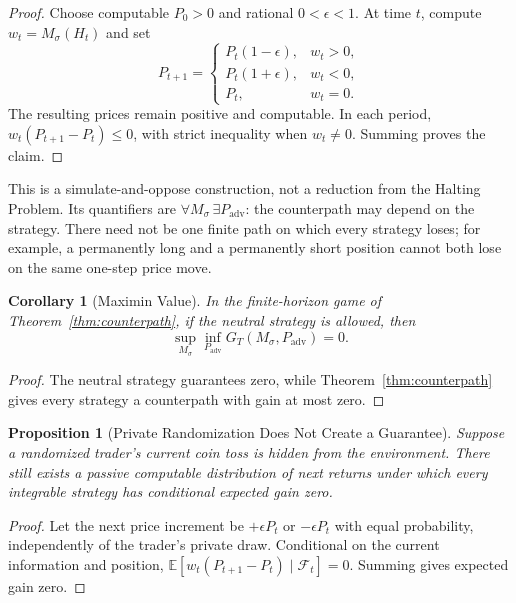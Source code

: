 \documentclass[aps,pra,reprint,superscriptaddress,amsmath,amssymb]{revtex4-2}
\theoremstyle{plain}
\newtheorem{corollary}[theorem]{Corollary}
\newtheorem{proposition}[theorem]{Proposition}
\theoremstyle{definition}
\theoremstyle{remark}
\begin{document}
\begin{proof}
Choose computable \(P_0>0\) and rational \(0<\epsilon<1\). At time \(t\),
compute \(w_t=M_\sigma(H_t)\) and set
\begin{equation}
P_{t+1}=
\begin{cases}
P_t(1-\epsilon),&w_t>0,\\
P_t(1+\epsilon),&w_t<0,\\
P_t,&w_t=0.
\end{cases}
\label{eq:adversary}
\end{equation}
The resulting prices remain positive and computable. In each period,
\(w_t(P_{t+1}-P_t)\leq0\), with strict inequality when \(w_t\neq0\).
Summing proves the claim.
\end{proof}

This is a simulate-and-oppose construction, not a reduction from the Halting
Problem. Its quantifiers are
\(\forall M_\sigma\,\exists P_{\mathrm{adv}}\): the counterpath may depend on
the strategy. There need not be one finite path on which every strategy loses;
for example, a permanently long and a permanently short position cannot both
lose on the same one-step price move.

\begin{corollary}[Maximin Value]
  \label{cor:maximin}
  In the finite-horizon game of Theorem~\ref{thm:counterpath}, if the neutral
  strategy is allowed, then
  \[
    \sup_{M_\sigma}\inf_{P_{\mathrm{adv}}}G_T(M_\sigma,P_{\mathrm{adv}})=0.
  \]
\end{corollary}

\begin{proof}
The neutral strategy guarantees zero, while
Theorem~\ref{thm:counterpath} gives every strategy a counterpath with gain at
most zero.
\end{proof}

\begin{proposition}[Private Randomization Does Not Create a Guarantee]
  \label{prop:randomized}
  Suppose a randomized trader's current coin toss is hidden from the
  environment. There still exists a passive computable distribution of next
  returns under which every integrable strategy has conditional expected gain
  zero.
\end{proposition}

\begin{proof}
Let the next price increment be \(+\epsilon P_t\) or \(-\epsilon P_t\) with
equal probability, independently of the trader's private draw. Conditional on
the current information and position,
\(\mathbb{E}[w_t(P_{t+1}-P_t)\mid\mathcal{F}_t]=0\).
Summing gives expected gain zero.
\end{proof}
\end{document}
